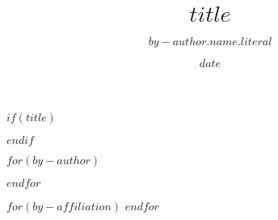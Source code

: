 $if(title)$
\title{$title$}
$endif$

$for(by-author)$
\author[$if(by-author.affiliations)$%
$for(by-author.affiliations)$$it.id$$sep$,$endfor$%
$endif$]{$by-author.name.literal$}
$endfor$

$for(by-affiliation)$
$endfor$

\date{$date$}
